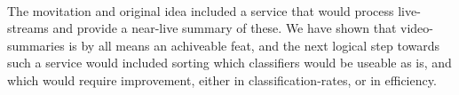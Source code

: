 \\
%
The movitation and original idea included a service that would process live-streams and provide a near-live summary of these. We have shown that video-summaries is by all means an achiveable feat, and the next logical step towards such a service would included sorting which classifiers would be useable as is, and which would require improvement, either in classification-rates, or in efficiency. %